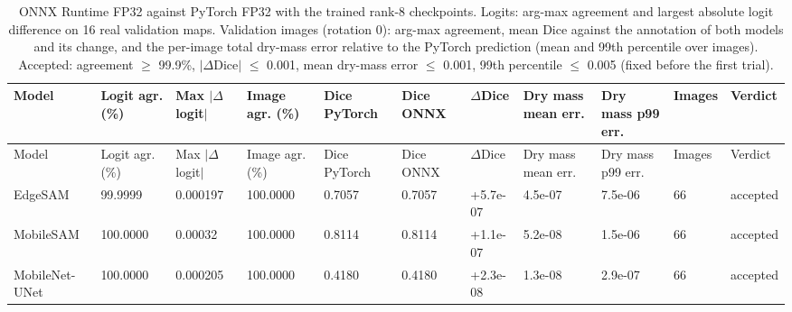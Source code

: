 \documentclass[10pt]{article}
\begin{document}
\begin{landscape}
{\scriptsize
\begin{longtable}{lllllllllll}
\caption{ONNX Runtime FP32 against PyTorch FP32 with the trained rank-8 checkpoints. Logits: arg-max agreement and largest absolute logit difference on 16 real validation maps. Validation images (rotation 0): arg-max agreement, mean Dice against the annotation of both models and its change, and the per-image total dry-mass error relative to the PyTorch prediction (mean and 99th percentile over images). Accepted: agreement $\geq$ 99.9\%, $|\Delta$Dice$|$ $\leq$ 0.001, mean dry-mass error $\leq$ 0.001, 99th percentile $\leq$ 0.005 (fixed before the first trial).}\label{tab:onnxequiv}\\
\toprule
Model & Logit agr. (\%) & Max $|\Delta$logit$|$ & Image agr. (\%) & Dice PyTorch & Dice ONNX & $\Delta$Dice & Dry mass mean err. & Dry mass p99 err. & Images & Verdict \\
\midrule
\endfirsthead
\toprule
Model & Logit agr. (\%) & Max $|\Delta$logit$|$ & Image agr. (\%) & Dice PyTorch & Dice ONNX & $\Delta$Dice & Dry mass mean err. & Dry mass p99 err. & Images & Verdict \\
\midrule
\endhead
\bottomrule
\endfoot
EdgeSAM & 99.9999 & 0.000197 & 100.0000 & 0.7057 & 0.7057 & +5.7e-07 & 4.5e-07 & 7.5e-06 & 66 & accepted \\
MobileSAM & 100.0000 & 0.00032 & 100.0000 & 0.8114 & 0.8114 & +1.1e-07 & 5.2e-08 & 1.5e-06 & 66 & accepted \\
MobileNet-UNet & 100.0000 & 0.000205 & 100.0000 & 0.4180 & 0.4180 & +2.3e-08 & 1.3e-08 & 2.9e-07 & 66 & accepted \\
\end{longtable}
}


\end{landscape}
\end{document}
